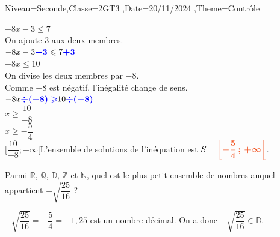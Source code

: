 \documentclass[a4paper,11pt,fleqn]{article}
\begin{document}
\begin{Maquette}[Fiche]{Niveau=Seconde,Classe=2GT3 ,Date=20/11/2024   ,Theme=Contrôle}
\begin{Solution}
 $-8x-3\leqslant7$\\On ajoute $3$ aux deux membres.\\$-8x-3{\color{blue}\boldsymbol{+3}}
          \leqslant7{\color{blue}\boldsymbol{+3}}$\\$-8x\leqslant10$\\On divise les deux membres par $-8$.\\Comme $-8$ est négatif, l'inégalité change de sens.\\$-8x{\color{blue}\boldsymbol{\div(-8)\geqslant}}10{\color{blue}\boldsymbol{\div(-8)}}$\\$x\geqslant\dfrac{10}{-8}$\\$x\geqslant-\dfrac{5}{4}$\\ $[\dfrac{10}{-8};+\infty[$L'ensemble de solutions de l'inéquation est $S =  {\color[HTML]{f15929}\boldsymbol{\left[ -\dfrac{5}{4}\,;\,+\infty \right[ }}$.
\end{Solution}

\begin{exercice}


 Parmi $\mathbb{R}$, $\mathbb{Q}$, $\mathbb{D}$, $\mathbb{Z}$ et $\mathbb{N}$, quel est le plus petit ensemble de nombres auquel appartient $-\sqrt{\dfrac{25}{16}}$ ?
\end{exercice}

\begin{Solution}
 $-\sqrt{\dfrac{25}{16}}=-\dfrac{5}{4}=-1{,}25$ est  un nombre décimal. On a donc $-\sqrt{\dfrac{25}{16}}\in \mathbb{D}$.
              
\end{Solution}

\end{Maquette}
\clearpage
\end{document}
